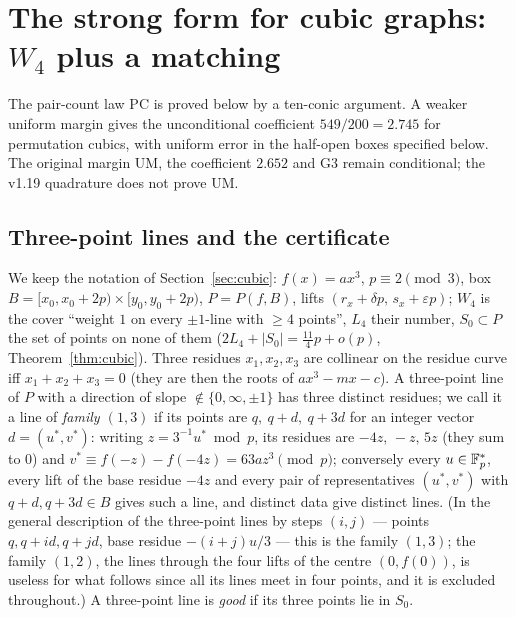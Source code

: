 
\section{The strong form for cubic graphs: \texorpdfstring{$W_4$}{W4} plus a matching}\label{sec:strong}

The pair-count law PC is proved below by a ten-conic argument.  A weaker uniform margin gives the unconditional
coefficient $549/200=2.745$ for permutation cubics, with uniform error in the half-open boxes specified below.
The original margin UM, the coefficient $2.652$ and G3 remain conditional; the v1.19 quadrature does not prove UM.

\subsection*{Three-point lines and the certificate}

We keep the notation of Section~\ref{sec:cubic}: $f(x)=ax^3$, $p\equiv2\pmod3$, box $B=[x_0,x_0+2p)\times[y_0,y_0+2p)$, $P=P(f,B)$, lifts
$(r_x+\delta p,\,s_x+\varepsilon p)$; $W_4$ is the cover ``weight $1$ on every $\pm1$-line with $\ge4$ points'', $L_4$ their number, $S_0\subset P$
the set of points on none of them ($2L_4+|S_0|=\tfrac{11}4p+o(p)$, Theorem~\ref{thm:cubic}).  Three residues $x_1,x_2,x_3$ are collinear on
the residue curve iff $x_1+x_2+x_3=0$ (they are then the roots of $ax^3-mx-c$).  A three-point line of $P$ with a direction of slope $\notin\{0,\infty,\pm1\}$
has three distinct residues; we call it a line of \emph{family $(1,3)$} if its points are $q,\ q+d,\ q+3d$ for an integer vector $d=(u^*,v^*)$: writing
$z=3^{-1}u^*\bmod p$, its residues are $-4z,\,-z,\,5z$ (they sum to $0$) and $v^*\equiv f(-z)-f(-4z)=63az^3\pmod p$; conversely every $u\in\mathbb{F}_p^*$, every lift
of the base residue $-4z$ and every pair of representatives $(u^*,v^*)$ with $q+d,q+3d\in B$ gives such a line, and distinct data give distinct lines.
(In the general description of the three-point lines by steps $(i,j)$ — points $q,q+id,q+jd$, base residue $-(i+j)u/3$ — this is the family $(1,3)$; the
family $(1,2)$, the lines through the four lifts of the centre $(0,f(0))$, is useless for what follows since all its lines meet in four points, and it is
excluded throughout.)  A three-point line is \emph{good}
if its three points lie in $S_0$.

